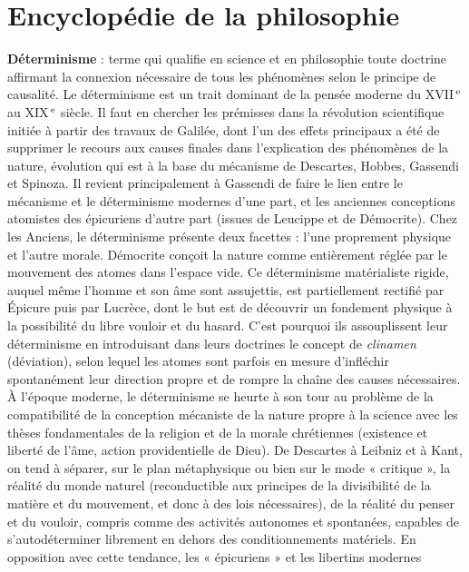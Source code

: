
\section{Encyclopédie de la philosophie}
{\bf Déterminisme} : terme qui qualifie en
science et en philosophie toute doctrine
affirmant la connexion nécessaire de tous
les phénomènes selon le principe de causalité. Le déterminisme est un trait dominant de la pensée moderne du {\footnotesize XVII}$^\text{\,e}$ au
{\footnotesize XIX}$^\text{\,e}$ siècle. Il faut en chercher les prémisses
dans la révolution scientifique initiée à
partir des travaux de Galilée, dont l’un
des effets principaux a été de supprimer
le recours aux causes finales dans l’explication des phénomènes de la nature, évolution qui est à la base du mécanisme de
Descartes, Hobbes, Gassendi et Spinoza.
Il revient principalement à Gassendi de
faire le lien entre le mécanisme et le
déterminisme modernes d’une part, et les
anciennes conceptions atomistes des épicuriens d’autre part (issues de Leucippe
et de Démocrite). Chez les Anciens, le
déterminisme présente deux facettes :
l'une proprement physique et l’autre
morale. Démocrite conçoit la nature
comme entièrement réglée par le mouvement des atomes dans l’espace vide. Ce
déterminisme matérialiste rigide, auquel
même l’homme et son âme sont assujettis,
est partiellement rectifié par Épicure puis
par Lucrèce, dont le but est de découvrir
un fondement physique à la possibilité du
libre vouloir et du hasard. C’est pourquoi
ils assouplissent leur déterminisme en
introduisant dans leurs doctrines le
concept de {\it clinamen} (déviation), selon
lequel les atomes sont parfois en mesure
d’infléchir spontanément leur direction
propre et de rompre la chaîne des causes
nécessaires. À l’époque moderne, le
déterminisme se heurte à son tour au problème de la compatibilité de la conception mécaniste de la nature propre à la
science avec les thèses fondamentales de
la religion et de la morale chrétiennes
(existence et liberté de l’âme, action providentielle de Dieu). De Descartes à
Leibniz et à Kant, on tend à séparer, sur
le plan métaphysique ou bien sur le mode
« critique », la réalité du monde naturel
(reconductible aux principes de la divisibilité de la matière et du mouvement, et
donc à des lois nécessaires), de la réalité
du penser et du vouloir, compris comme
des activités autonomes et spontanées,
capables de s’autodéterminer librement
en dehors des conditionnements matériels. En opposition avec cette tendance,
les « épicuriens » et les libertins modernes
